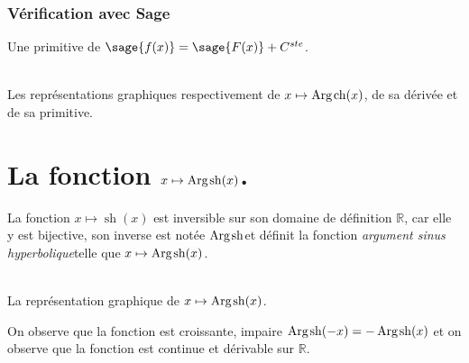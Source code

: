 \documentclass[a4paper,landscape,17pt]{extreport} %
\def\eclaire{\mathbb}
\def\R{\ensuremath{\eclaire R}}
\renewcommand{\sinh}{\mathop{\mathrm{sh}}}
\renewcommand{\cosh}{\mathop{\mathrm{ch}}}
\renewcommand{\arg}{\mathop{\mathrm{Arg}}}
\begin{document}
\subsubsection{Vérification avec Sage}

Une primitive de $\sage{f(x)} = \sage{F(x)} + C^{ste} $.

\begin{center}
\\
Les représentations graphiques respectivement de $x \mapsto \arg\mspace{-1mu}\cosh(x)$, de sa dérivée et de sa primitive.
\end{center}



\section{La fonction  $x \mapsto \arg\mspace{-1mu}\sinh(x)$.}

La fonction $x \mapsto \sinh(x)$ est inversible sur son domaine de définition $\R$, car elle y est bijective, son inverse est notée \og$ \arg\mspace{-1mu}\sinh $\fg et définit la fonction \og\emph{argument sinus hyperbolique}\fg telle que $x \mapsto \arg\mspace{-1mu}\sinh(x)$.


\begin{center}
 \\
La représentation graphique de $x \mapsto \arg\mspace{-1mu}\sinh(x)$.
\end{center}
On observe que la fonction est croissante, impaire $\arg\mspace{-1mu}\sinh(-x) = -\arg\mspace{-1mu}\sinh(x) $
et on observe que la fonction est continue et dérivable sur $\R$.                                                                                                             
\end{document}
